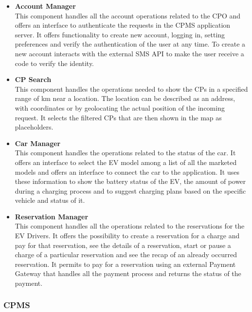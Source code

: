 \begin{itemize}
    \item \textbf{Account Manager} \\ This component handles all the account operations related to the CPO and offers an interface to authenticate
          the requests in the CPMS application server.
          It offers functionality to create new account, logging in, setting preferences and verify the authentication of the user at any time.
          To create a new account interacts with the external SMS API to make the user receive a code to verify the identity.
    \item \textbf{CP Search} \\ This component handles the operations needed to show the CPs in a specified range of km near a location. The location
        can be described as an address, with coordinates or by geolocating the actual position of the incoming request. It selects the filtered CPs that are then 
        shown in the map as placeholders.  
    \item \textbf{Car Manager} \\ This component handles the operations related to the status of the car. It offers an interface to select the EV model among a list of 
        all the marketed models and offers an interface to connect the car to the application. It uses these information to show the battery status of the EV, the 
        amount of power during a charging process and to suggest charging plans based on the specific vehicle and status of it.
    \item \textbf{Reservation Manager} \\ This component handles all the operations related to the reservations for the EV Drivers. It offers the possibility to create a reservation
    for a charge and pay for that reservation, see the details of a reservation, start or pause a charge of a particular reservation and see the recap of an already occurred reservation.
    It permits to pay for a reservation using an external Payment Gateway that handles all the payment process and returns the status of the payment.  

\end{itemize}


\subsubsection{CPMS}

